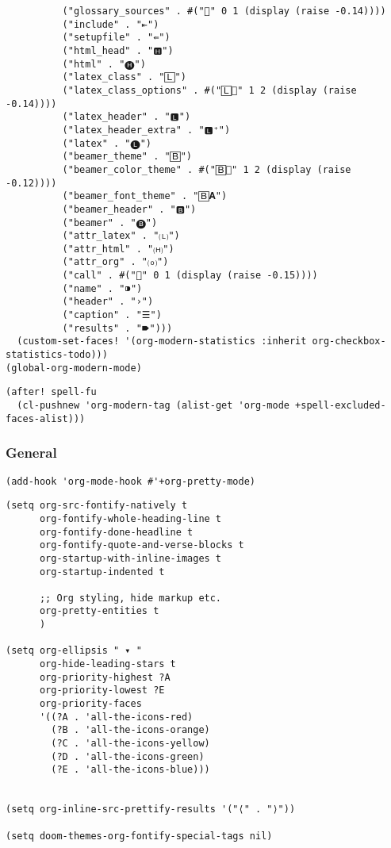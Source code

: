 \documentclass[c]{article}
\theoremstyle{plain}%
\theoremstyle{definition}
\theoremstyle{remark}
\begin{document}
\begin{verbatim}
          ("glossary_sources" . #("" 0 1 (display (raise -0.14))))
          ("include" . "⇤")
          ("setupfile" . "⇚")
          ("html_head" . "🅷")
          ("html" . "🅗")
          ("latex_class" . "🄻")
          ("latex_class_options" . #("🄻" 1 2 (display (raise -0.14))))
          ("latex_header" . "🅻")
          ("latex_header_extra" . "🅻⁺")
          ("latex" . "🅛")
          ("beamer_theme" . "🄱")
          ("beamer_color_theme" . #("🄱" 1 2 (display (raise -0.12))))
          ("beamer_font_theme" . "🄱𝐀")
          ("beamer_header" . "🅱")
          ("beamer" . "🅑")
          ("attr_latex" . "🄛")
          ("attr_html" . "🄗")
          ("attr_org" . "⒪")
          ("call" . #("" 0 1 (display (raise -0.15))))
          ("name" . "⁍")
          ("header" . "›")
          ("caption" . "☰")
          ("results" . "🠶")))
  (custom-set-faces! '(org-modern-statistics :inherit org-checkbox-statistics-todo)))
(global-org-modern-mode)
\end{verbatim}
\begin{verbatim}
(after! spell-fu
  (cl-pushnew 'org-modern-tag (alist-get 'org-mode +spell-excluded-faces-alist)))
\end{verbatim}
\subsubsection{General}
\label{sec:org86d0709}
\begin{verbatim}
(add-hook 'org-mode-hook #'+org-pretty-mode)
\end{verbatim}

\begin{verbatim}
(setq org-src-fontify-natively t
      org-fontify-whole-heading-line t
      org-fontify-done-headline t
      org-fontify-quote-and-verse-blocks t
      org-startup-with-inline-images t
      org-startup-indented t

      ;; Org styling, hide markup etc.
      org-pretty-entities t
      )

(setq org-ellipsis " ▾ "
      org-hide-leading-stars t
      org-priority-highest ?A
      org-priority-lowest ?E
      org-priority-faces
      '((?A . 'all-the-icons-red)
        (?B . 'all-the-icons-orange)
        (?C . 'all-the-icons-yellow)
        (?D . 'all-the-icons-green)
        (?E . 'all-the-icons-blue)))


(setq org-inline-src-prettify-results '("⟨" . "⟩"))

(setq doom-themes-org-fontify-special-tags nil)
\end{verbatim}
\end{document}
